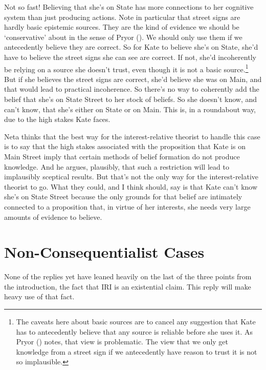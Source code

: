 \documentclass[
  10pt,
  letterpaper,
  DIV=11,
  numbers=noendperiod,
  twoside]{scrartcl}
\begin{document}
Not so fast! Believing that she's on State has more connections to her
cognitive system than just producing actions. Note in particular that
street signs are hardly basic epistemic sources. They are the kind of
evidence we should be `conservative' about in the sense of Pryor
(). We should only use them if we
antecedently believe they are correct. So for Kate to believe she's on
State, she'd have to believe the street signs she can see are correct.
If not, she'd incoherently be relying on a source she doesn't trust,
even though it is not a basic source.\footnote{The caveats here about
  basic sources are to cancel any suggestion that Kate has to
  antecedently believe that any source is reliable before she uses it.
  As Pryor () notes, that view is
  problematic. The view that we only get knowledge from a street sign if
  we antecedently have reason to trust it is not so implausible.} But if
she believes the street signs are correct, she'd believe she was on
Main, and that would lead to practical incoherence. So there's no way to
coherently add the belief that she's on State Street to her stock of
beliefs. So she doesn't know, and can't know, that she's either on State
or on Main. This is, in a roundabout way, due to the high stakes Kate
faces.

Neta thinks that the best way for the interest-relative theorist to
handle this case is to say that the high stakes associated with the
proposition that Kate is on Main Street imply that certain methods of
belief formation do not produce knowledge. And he argues, plausibly,
that such a restriction will lead to implausibly sceptical results. But
that's not the only way for the interest-relative theorist to go. What
they could, and I think should, say is that Kate can't know she's on
State Street because the only grounds for that belief are intimately
connected to a proposition that, in virtue of her interests, she needs
very large amounts of evidence to believe.

\section{Non-Consequentialist Cases}\label{non-consequentialist-cases}

None of the replies yet have leaned heavily on the last of the three
points from the introduction, the fact that IRI is an existential claim.
This reply will make heavy use of that fact.
\end{document}
